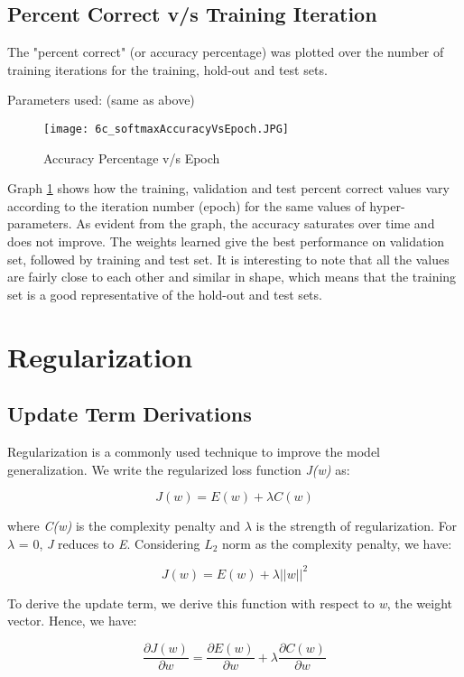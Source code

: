 \documentclass{article}
\begin{document}
\subsection{Percent Correct v/s Training Iteration}

The "percent correct" (or accuracy percentage) was plotted over the number of training iterations for the training, hold-out and test sets. 

Parameters used: (same as above)

\begin{figure}
  \texttt{[image: 6c\_softmaxAccuracyVsEpoch.JPG]}
  \caption{Accuracy Percentage v/s Epoch}
  \label{fig:graph 6(c)}
\end{figure}

Graph \ref{fig:graph 6(c)} shows how the training, validation and test percent correct values vary according to the iteration number (epoch) for the same values of hyper-parameters. As evident from the graph, the accuracy saturates over time and does not improve. The weights learned give the best performance on validation set, followed by training and test set. It is interesting to note that all the values are fairly close to each other and similar in shape, which means that the training set is a good representative of the hold-out and test sets.

\section{Regularization}

\subsection{Update Term Derivations}

Regularization is a commonly used technique to improve the model generalization. We write the regularized loss function \emph{J(w)} as:

$$J(w) = E(w) + \lambda C(w)$$

where \emph{C(w)} is the complexity penalty and $\lambda$ is the strength of regularization. For $\lambda$ = 0, \emph{J} reduces to \emph{E}. Considering $L_{2}$ norm as the complexity penalty, we have:

$$J(w) = E(w) + \lambda ||w||^2$$

To derive the update term, we derive this function with respect to \emph{w}, the weight vector. Hence, we have:

$$\frac{\partial J(w)}{\partial w} = \frac{\partial E(w)}{\partial w} + \lambda\frac{\partial C(w)}{\partial w}$$
\end{document}
